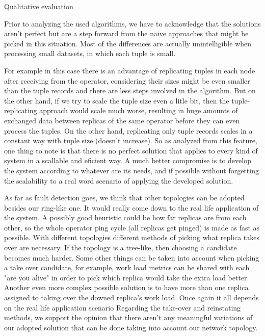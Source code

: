 \documentclass[times, 10pt,twocolumn]{article}
\begin{document}

Qualitative evaluation


Prior to analyzing the used algorithms, we have to acknowledge that the
solutions aren't perfect but are a step forward from the naive approaches
that might be picked in this situation. Most of the differences are
actually unintelligible when processing small datasets, in which each
tuple is small. 

For example in this case there is an advantage of replicating tuples in
each node after receiving from the operator, considering their sizes might
be even smaller than the tuple records and there are less steps involved
in the algorithm. But on the other hand, if we try to scale the tuple size
even a litle bit, then the tuple-replicating approach would scale much
worse, resulting in huge amounts of exchanged data between replicas of the
same operator before they can even process the tuples. On the other hand,
replicating only tuple records scales in a constant way with tuple size
(doesn't increase).  So as analyzed from this feature, one thing to note
is that there is no perfect solution that applies to every kind of system
in a scallable and eficient way.  A much better compromise is to develop
the system according to whatever are its needs, and if possible without
forgetting the scalability to a real word scenario of applying the
developed solution.

As far as fault detection goes, we think that other topologies can be
adopted besides our ring-like one. It would really come down to the real
life application of the system. A possibly good heuristic could be how far
replicas are from each other, so the whole operator ping cycle (all
replicas get pinged) is made as fast as possible. With different
topologies different methods of picking what replica takes over are
necessary. If the topology is a tree-like, then choosing a candidate
becomes much harder. Some other things can be taken into account when
picking a take over candidate, for example, work load metrics can be
shared with each "are you alive" in order to pick which replica would take
the extra load better. Another even more complex possible solution is to
have more than one replica assigned to taking over the downed replica's
work load. Once again it all depends on the real life application scenario
Regarding the take-over and reinstating methods, we support the opinion
that there aren't any meaningful variations of our adopted solution that
can be done taking into account our network topology.
\end{document}
